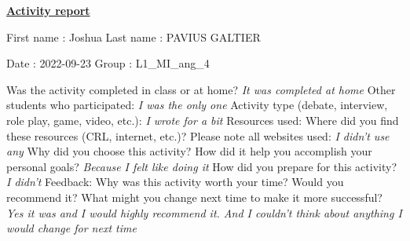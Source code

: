 \documentclass[]{article}
\begin{document}
  \begin{center}
    \underline{\textbf{Activity report}}
  \end{center}
  \vspace*{20 pt}

First name : Joshua
  \hspace*{120pt}
Last name : PAVIUS GALTIER
  \newline

Date : 2022-09-23
  \hspace*{170pt}
Group : L1\_MI\_ang\_4
  \newline

  Was the activity completed in class or at home? \newline
\indent\emph{It was completed at home}
  \newline
  \indent Other students who participated: \newline
\indent\emph{I was the only one}
  \newline\newline\newline\newline
  Activity type (debate, interview, role play, game, video, etc.):
\indent\emph{I wrote for a bit}
  \newline\newline\newline\newline
  Resources used: Where did you find these resources (CRL, internet, etc.)? Please note all websites used: 
\indent\emph{I didn't use any}
  \newline\newline\newline\newline
  Why did you choose this activity? How did it help you accomplish your personal goals?
\indent\emph{Because I felt like doing it}
  \newline\newline\newline\newline
  How did you prepare for this activity? 
\indent\emph{I didn't}
  \newline\newline\newline\newline
  Feedback: Why was this activity worth your time? Would you recommend it? What might you change next time to make it more successful? 
  \newline\newline
\indent\emph{Yes it was and I would highly recommend it. And I couldn't think about anything I would change for next time}
\end{document}
